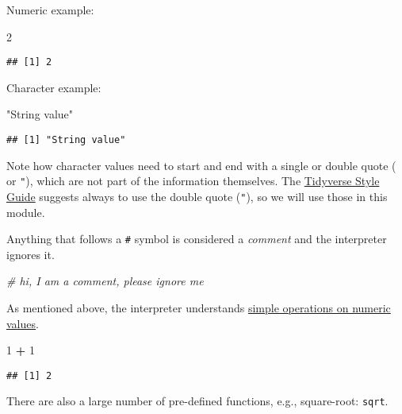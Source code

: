 \documentclass[
]{book}
\newenvironment{Shaded}{\begin{snugshade}}{\end{snugshade}}
\newcommand{\CommentTok}[1]{\textcolor[rgb]{0.56,0.35,0.01}{\textit{#1}}}
\newcommand{\DecValTok}[1]{\textcolor[rgb]{0.00,0.00,0.81}{#1}}
\newcommand{\OperatorTok}[1]{\textcolor[rgb]{0.81,0.36,0.00}{\textbf{#1}}}
\newcommand{\StringTok}[1]{\textcolor[rgb]{0.31,0.60,0.02}{#1}}
\begin{document}
Numeric example:

\begin{Shaded}
\begin{Highlighting}[]
\DecValTok{2}
\end{Highlighting}
\end{Shaded}

\begin{verbatim}
## [1] 2
\end{verbatim}

Character example:

\begin{Shaded}
\begin{Highlighting}[]
\StringTok{"String value"}
\end{Highlighting}
\end{Shaded}

\begin{verbatim}
## [1] "String value"
\end{verbatim}

Note how character values need to start and end with a single or double quote (\texttt{\textquotesingle{}} or \texttt{"}), which are not part of the information themselves. The \href{https://style.tidyverse.org/syntax.html}{Tidyverse Style Guide} suggests always to use the double quote (\texttt{"}), so we will use those in this module.

Anything that follows a \texttt{\#} symbol is considered a \emph{comment} and the interpreter ignores it.

\begin{Shaded}
\begin{Highlighting}[]
\CommentTok{# hi, I am a comment, please ignore me}
\end{Highlighting}
\end{Shaded}

As mentioned above, the interpreter understands \href{https://stat.ethz.ch/R-manual/R-devel/library/base/html/Arithmetic.html}{simple operations on numeric values}.

\begin{Shaded}
\begin{Highlighting}[]
\DecValTok{1} \OperatorTok{+}\StringTok{ }\DecValTok{1}
\end{Highlighting}
\end{Shaded}

\begin{verbatim}
## [1] 2
\end{verbatim}

There are also a large number of pre-defined functions, e.g., square-root: \texttt{sqrt}.
\end{document}
